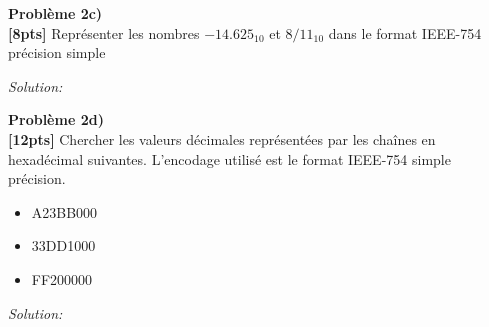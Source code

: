 \documentclass{article}
\newenvironment{problem}[2][Problème]
    { \begin{mdframed}[backgroundcolor=gray!20] \textbf{#1 #2} \\}
    {  \end{mdframed}}
\newenvironment{solution}
    {\textit{Solution:}}
    {}
\begin{document}
\begin{problem}{2c)}
\textbf{[8pts]} Représenter les nombres $-14.625_{10}$ et $8/11_{10}$ dans le format IEEE-754 précision simple
\end{problem}

\begin{solution}
\end{solution}


\begin{problem}{2d)}
\textbf{[12pts]} Chercher les valeurs décimales représentées par les chaînes en hexadécimal
suivantes. L’encodage utilisé est le format IEEE-754 simple précision.
\begin{itemize}
    \item A23BB000
    \item 33DD1000
    \item FF200000
\end{itemize}
\end{problem}

\begin{solution}
\end{solution}
\end{document}
